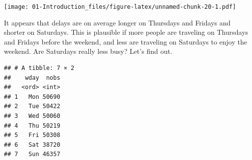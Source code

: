 \documentclass[]{book}
\newenvironment{Shaded}{\begin{snugshade}}{\end{snugshade}}
\newcommand{\KeywordTok}[1]{\textcolor[rgb]{0.13,0.29,0.53}{\textbf{{#1}}}}
\newcommand{\DataTypeTok}[1]{\textcolor[rgb]{0.13,0.29,0.53}{{#1}}}
\newcommand{\StringTok}[1]{\textcolor[rgb]{0.31,0.60,0.02}{{#1}}}
\newcommand{\NormalTok}[1]{{#1}}
\theoremstyle{definition}
\theoremstyle{definition}
\theoremstyle{remark}
\begin{document}
\begin{Shaded}
\end{Shaded}

\texttt{[image: 01-Introduction\_files/figure-latex/unnamed-chunk-20-1.pdf]}

It appears that delays are on average longer on Thursdays and Fridays
and shorter on Saturdays. This is plausible if more people are traveling
on Thursdays and Fridays before the weekend, and less are traveling on
Saturdays to enjoy the weekend. Are Saturdays really less busy? Let's
find out.

\begin{Shaded}
\end{Shaded}

\begin{verbatim}
## # A tibble: 7 × 2
##    wday  nobs
##   <ord> <int>
## 1   Mon 50690
## 2   Tue 50422
## 3   Wed 50060
## 4   Thu 50219
## 5   Fri 50308
## 6   Sat 38720
## 7   Sun 46357
\end{verbatim}
\end{document}
